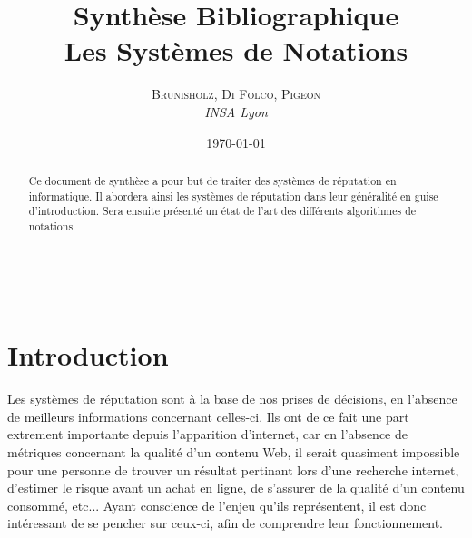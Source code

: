 \documentclass[a4paper, 11pt]{article} %
\title{\textbf{Synthèse Bibliographique}\\ %
Les Systèmes de Notations} %
\author{\textsc{Brunisholz, Di Folco, Pigeon} %
\\{\textit{INSA Lyon}}} %
\date{\today} %
\makeatletter
\renewcommand{\maketitle}{ %
\begin{flushright} %
{\LARGE\@title} %

\vspace{50pt} %

{\large\@author} %
\\\@date %

\vspace{40pt} %
\end{flushright}
}
\makeatother
\begin{document}
\maketitle %



\begin{abstract}
	Ce document de synthèse a pour but de traiter des systèmes de réputation en informatique.
	Il abordera ainsi les systèmes de réputation dans leur généralité en guise d'introduction.
	Sera ensuite présenté un état de l'art des différents algorithmes de notations.
\end{abstract}


\vspace{30pt} %


\section{Introduction}
Les systèmes de réputation sont à la base de nos prises de décisions, en l'absence de meilleurs informations concernant celles-ci.
Ils ont de ce fait une part extrement importante depuis l'apparition d'internet, car en l'absence de métriques concernant la qualité d'un contenu Web,
il serait quasiment impossible pour une personne de trouver un résultat pertinant lors d'une recherche internet, d'estimer le risque avant un achat en ligne,
de s'assurer de la qualité d'un contenu consommé, etc...
Ayant conscience de l'enjeu qu'ils représentent, il est donc intéressant de se pencher sur ceux-ci, afin de comprendre leur fonctionnement.

\end{document}
